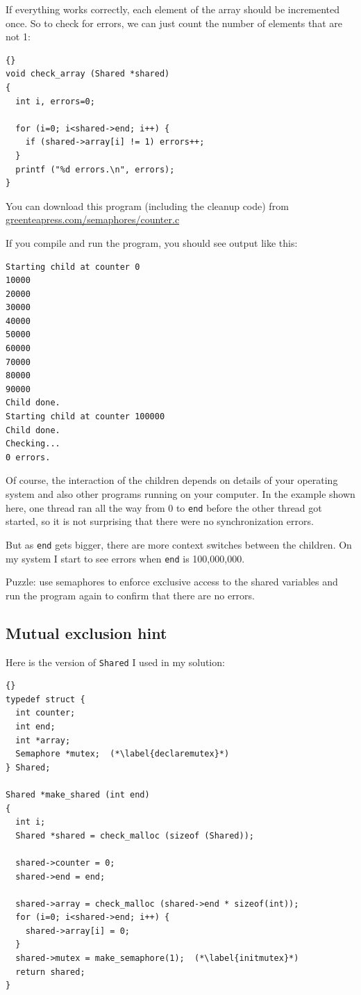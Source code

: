 \documentclass{book}
\newcommand{\clearemptydoublepage}{\newpage\cleardoublepage}
\begin{document}
If everything works correctly, each element of the array should be
incremented once.  So to check for errors, we can just count the
number of elements that are not 1:

\begin{lstlisting}[title={}]{}
void check_array (Shared *shared)
{
  int i, errors=0;

  for (i=0; i<shared->end; i++) {
    if (shared->array[i] != 1) errors++;
  }
  printf ("%d errors.\n", errors);
}
\end{lstlisting}

You can download this program (including the cleanup code) from
\url{greenteapress.com/semaphores/counter.c}

If you compile and run the program, you should see output like this:

\begin{verbatim}
Starting child at counter 0
10000
20000
30000
40000
50000
60000
70000
80000
90000
Child done.
Starting child at counter 100000
Child done.
Checking...
0 errors.
\end{verbatim}

Of course, the interaction of the children depends on details
of your operating system and also other programs running on your
computer.  In the example shown here, one thread ran all the way
from 0 to {\tt end} before the other thread got started, so it is
not surprising that there were no synchronization errors.

But as {\tt end} gets bigger, there are more context switches between
the children.  On my system I start to see errors when
{\tt end} is 100,000,000.

Puzzle: use semaphores to enforce exclusive access to the shared
variables and run the program again to confirm that there are
no errors.

\clearemptydoublepage
\subsection{Mutual exclusion hint}

Here is the version of {\tt Shared} I used in my solution:

\begin{lstlisting}[title={}]{}
typedef struct {
  int counter;
  int end;
  int *array;
  Semaphore *mutex;  (*\label{declaremutex}*)
} Shared;

Shared *make_shared (int end)
{
  int i;
  Shared *shared = check_malloc (sizeof (Shared));

  shared->counter = 0;
  shared->end = end;

  shared->array = check_malloc (shared->end * sizeof(int));
  for (i=0; i<shared->end; i++) {
    shared->array[i] = 0;
  }
  shared->mutex = make_semaphore(1);  (*\label{initmutex}*)
  return shared;
}
\end{lstlisting}
\end{document}
